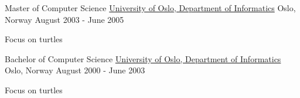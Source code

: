 

\begin{cventries}

  \cventry
    {Master of Computer Science} %
    {\href{https://www.mn.uio.no/ifi/}{University of Oslo, Department of Informatics}} %
    {Oslo, Norway} %
    {August 2003 - June 2005} %
    {
      \begin{cvitems} %
        \item {Focus on turtles}
      \end{cvitems}
    }

  \cventry
    {Bachelor of Computer Science} %
    {\href{https://www.mn.uio.no/ifi/}{University of Oslo, Department of Informatics}} %
    {Oslo, Norway} %
    {August 2000 - June 2003} %
    {
      \begin{cvitems} %
        \item {Focus on turtles}
      \end{cvitems}
    }

\end{cventries}
